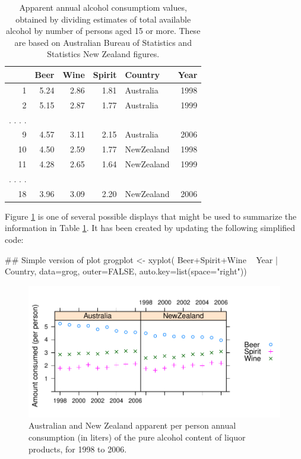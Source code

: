 \documentclass{tufte-book}\usepackage[]{graphicx}\usepackage[]{color}
\begin{document}
\begin{table}
\begin{center}
\caption{Apparent annual alcohol consumptiom values, obtained by dividing
    estimates of total available alcohol by number of persons aged 15
    or more. These are based on Australian Bureau of Statistics
    and Statistics New Zealand figures.\label{tab:grog}}
\begin{tabular}{rrrrlr}
  \hline
 & Beer & Wine & Spirit & Country & Year \\
  \hline
1 & 5.24 & 2.86 & 1.81 & Australia & 1998 \\
  2 & 5.15 & 2.87 & 1.77 & Australia & 1999 \\
. . . .\\
  9 & 4.57 & 3.11 & 2.15 & Australia & 2006 \\
  10 & 4.50 & 2.59 & 1.77 & NewZealand & 1998 \\
  11 & 4.28 & 2.65 & 1.64 & NewZealand & 1999 \\
. . . .\\
  18 & 3.96 & 3.09 & 2.20 & NewZealand & 2006 \\
   \hline
\end{tabular}
\end{center}
\end{table}

Figure \ref{fig:allgrog} is one of several possible displays that
might be used to summarize the information in Table \ref{tab:grog}.
It has been created by updating the following simplified code:
\noindent
\begin{Schunk}
\begin{Sinput}
## Simple version of plot
grogplot <- xyplot(
              Beer+Spirit+Wine ~ Year | Country,
              data=grog, outer=FALSE,
              auto.key=list(space="right"))
\end{Sinput}
\end{Schunk}


\begin{figure}
\begin{Schunk}


\centerline{\includegraphics[width=\textwidth]{figs/07-grog-all-1} }

\end{Schunk}
\caption{Australian and New Zealand apparent per person annual
  consumption (in liters) of the pure alcohol content of liquor products, for
  1998 to 2006.\label{fig:allgrog}}
\end{figure}
\end{document}
